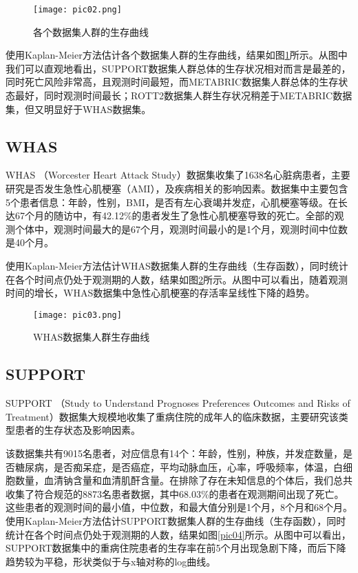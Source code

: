 \begin{figure}[H]
\texttt{[image: pic02.png]}
\caption{各个数据集人群的生存曲线}
\label{pic02}
\end{figure}

使用Kaplan-Meier方法估计各个数据集人群的生存曲线，结果如图\ref{pic02}所示。从图中我们可以直观地看出，SUPPORT数据集人群总体的生存状况相对而言是最差的，同时死亡风险非常高，且观测时间最短，而METABRIC数据集人群总体的生存状态最好，同时观测时间最长；ROTT2数据集人群生存状况稍差于METABRIC数据集，但又明显好于WHAS数据集。

\subsection{WHAS}

WHAS （Worcester Heart Attack Study）数据集收集了1638名心脏病患者，主要研究是否发生急性心肌梗塞（AMI），及疾病相关的影响因素。数据集中主要包含5个患者信息：年龄，性别，BMI，是否有左心衰竭并发症，心肌梗塞等级。在长达67个月的随访中，有42.12\%的患者发生了急性心肌梗塞导致的死亡。全部的观测个体中，观测时间最大的是67个月，观测时间最小的是1个月，观测时间中位数是40个月。

使用Kaplan-Meier方法估计WHAS数据集人群的生存曲线（生存函数），同时统计在各个时间点仍处于观测期的人数，结果如图\ref{pic03}所示。从图中可以看出，随着观测时间的增长，WHAS数据集中急性心肌梗塞的存活率呈线性下降的趋势。

\begin{figure}[H]
\texttt{[image: pic03.png]}
\caption{WHAS数据集人群生存曲线}
\label{pic03}
\end{figure}

\subsection{SUPPORT}

SUPPORT （Study to Understand Prognoses Preferences Outcomes and Risks of Treatment）数据集大规模地收集了重病住院的成年人的临床数据，主要研究该类型患者的生存状态及影响因素。

该数据集共有9015名患者，对应信息有14个：年龄，性别，种族，并发症数量，是否糖尿病，是否痴呆症，是否癌症，平均动脉血压，心率，呼吸频率，体温，白细胞数量，血清钠含量和血清肌酐含量。在排除了存在未知信息的个体后，我们总共收集了符合规范的8873名患者数据，其中68.03\%的患者在观测期间出现了死亡。这些患者的观测时间的最小值，中位数，和最大值分别是1个月，8个月和68个月。使用Kaplan-Meier方法估计SUPPORT数据集人群的生存曲线（生存函数），同时统计在各个时间点仍处于观测期的人数，结果如图\ref{pic04}所示。从图中可以看出，SUPPORT数据集中的重病住院患者的生存率在前5个月出现急剧下降，而后下降趋势较为平稳，形状类似于与x轴对称的log曲线。


